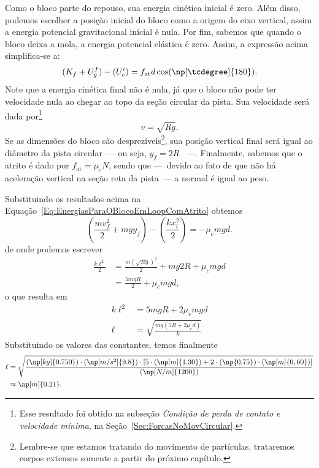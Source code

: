 Como o bloco parte do repouso, sua energia cinética inicial é zero. Além disso, podemos escolher a posição inicial do bloco como a origem do eixo vertical, assim a energia potencial gravitacional inicial é nula. Por fim, sabemos que quando o bloco deixa a mola, a energia potencial elástica é zero. Assim, a expressão acima simplifica-se a:
\begin{equation}\label{Eq:EnergiasParaOBlocoEmLoopComAtrito}
    (K_f + U_g^f) - (U_e^i) = f_{\textrm{at}} d \cos(\np[\tcdegree]{180}).
\end{equation}
%
Note que a energia cinética final não é nula, já que o bloco não pode ter velocidade nula ao chegar ao topo da seção circular da pista. Sua velocidade será dada por\footnote{Esse resultado foi obtido na subseção \emph{Condição de perda de contato e velocidade mínima}, na Seção~\ref{Sec:ForcasNoMovCircular}.}
\begin{equation}
    v = \sqrt{Rg}.
\end{equation}
%
Se as dimensões do bloco são desprezíveis\footnote{Lembre-se que estamos tratando do movimento de partículas, trataremos corpos extensos somente a partir do próximo capítulo.}, sua posição vertical final será igual ao diâmetro da pista circular ---~ou seja, $y_f = 2R$ ~---. Finalmente, sabemos que o atrito é dado por $f_{\textrm{at}} = \mu_c N$, sendo que ---~devido ao fato de que não há aceleração vertical na seção reta da pista~--- a normal é igual ao peso.

Substituindo os resultados acima na Equação~\ref{Eq:EnergiasParaOBlocoEmLoopComAtrito} obtemos
\begin{equation}
    \left(\frac{mv_f^2}{2} + mgy_f\right) - \left(\frac{kx_i^2}{2}\right) = - \mu_c mg d.
\end{equation}
%
de onde podemos escrever
\begin{align}
    \frac{k\ell^2}{2} &= \frac{m(\sqrt{Rg})^2}{2} + mg2R + \mu_c mg d \\
    &= \frac{5mgR}{2} + \mu_c mg d,
\end{align}
%
o que resulta em
\begin{align}
    k\ell^2 &= 5mgR + 2 \mu_c mg d \\
    \ell &= \sqrt{\frac{mg(5R + 2 \mu_c d)}{k}}
\end{align}
%
Substituindo os valores das constantes, temos finalmente
\begin{align}
    \ell &= \sqrt{\frac{(\np[kg]{0.750}) \cdot (\np[m/s^2]{9.8}) \cdot [5 \cdot (\np[m]{1.30}) + 2 \cdot (\np{0.75}) \cdot (\np[m]{0,60})]}{(\np[N/m]{1200})}} \\
    &\approx \np[m]{0.21}.
\end{align}


